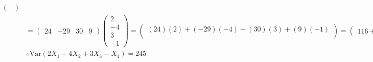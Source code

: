 \begin{sol}
\begin{itemize}
\begin{align*}
\begin{pmatrix}
\end{pmatrix}\\
&= \begin{pmatrix}
24& -29& 30 & 9
\end{pmatrix}
\begin{pmatrix}
2 \\ -4 \\ 3 \\ -1 
\end{pmatrix}=
\begin{pmatrix}
(24)(2)+(-29)(-4)+(30)(3)+(9)(-1)\\
\end{pmatrix}
=
\begin{pmatrix}
116+90-9
\end{pmatrix}\\
& \therefore \text{Var}(2X_1-4X_2+3X_3-X_4)=245
\end{align*}

\end{itemize}
\end{sol}